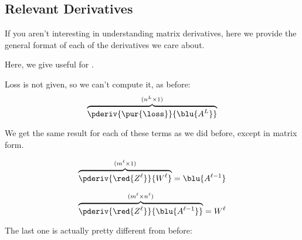 
    \subsection*{Relevant Derivatives}
    
        If you aren't interesting in understanding matrix derivatives, here we provide the general format of each of the derivatives we care about.\\
        
        \begin{notation}
            Here, we give useful  for .
        
            \boxdiv
            
            Loss is not given, so we can't compute it, as before:
            \begin{equation*}
                \overbrace{
                    \pderiv {\pur{\loss}}{\blu{A^L}}
                }^{(n^{L} \times 1)}
            \end{equation*}
            
            \boxdiv
            
            We get the same result for each of these terms as we did before, except in matrix form.
            
            \begin{equation*}
                \overbrace{
                    \pderiv {\red{Z^\ell}}   {W^{\ell}} 
                }^{ (m^{\ell} \times 1) }
                = 
                \blu{A^{\ell-1}}
            \end{equation*}
            
            \begin{equation*}
                \overbrace{
                    \pderiv{\red{Z^\ell}} {\blu{A^{\ell-1}}}
                }^{ (m^{\ell} \times n^{\ell}) }
                =
                W^\ell
            \end{equation*}
            
            \boxdiv
            
            The last one is actually pretty different from before:
            

\end{notation}

